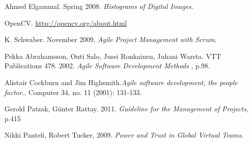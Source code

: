 \begin{thebibliography}{}
 Ahmed Elgammal. Spring 2008. \emph{Histograms of Digital Images}.


 OpenCV. \url{http://opencv.org/about.html}




 K. Schwaber. November 2009. \emph{Agile Project Management with Scrum}.

 Pekka Abrahamsson, Outi Salo, Jussi Ronkainen, Juhani Warsta. VTT Publications 478. 2002. \emph{Agile Software Development Methods} , p.98.

 Alistair Cockburn and Jim Highsmith.\emph{Agile software development, the people factor.}, Computer 34, no. 11 (2001): 131-133.

 Gerold Patzak, Günter Rattay. 2011. \emph{Guideline for the Management of Projects}, p.415

 Nikki Panteli, Robert Tucker, 2009. \emph{Power and Trust in Global Virtual Teams}.



\end{thebibliography}